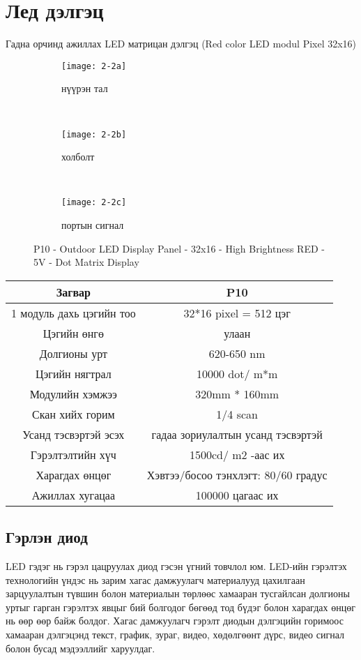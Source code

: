 \section{Лед дэлгэц}
Гадна орчинд ажиллах LED матрицан дэлгэц (Red color LED modul  Pixel 32x16)
\begin{figure}[!ht]
	\centering
	\begin{subfigure}[b]{0.3\textwidth}
		\texttt{[image: 2-2a]}
		\caption{нүүрэн тал}
	\end{subfigure}
	~
	\begin{subfigure}[b]{0.3\textwidth}
		\texttt{[image: 2-2b]}
		\caption{холболт}
	\end{subfigure}
	~
	\begin{subfigure}[b]{0.3\textwidth}
		\texttt{[image: 2-2c]}
		\caption{портын сигнал}
	\end{subfigure}
	\caption[P10 - Outdoor LED Display Panel]{P10 - Outdoor LED Display Panel - 32x16 - High Brightness RED - 5V - Dot Matrix Display}
\end{figure}

\begin{tabular}{|c|c|}
	\hline
	 Загвар &	 P10 \\ \hline
	1 модуль дахь цэгийн тоо &	32*16 pixel    =     512 цэг  \\ \hline
	Цэгийн өнгө  &	 улаан   \\ \hline           
	Долгионы урт  &	620-650  nm \\ \hline
	Цэгийн нягтрал &	 10000 dot/ m*m \\ \hline
	Модулийн хэмжээ&	 320mm * 160mm \\ \hline
	Скан хийх горим	& 1/4  scan \\ \hline
	Усанд тэсвэртэй эсэх &	гадаа зориулалтын усанд тэсвэртэй \\ \hline
	 Гэрэлтэлтийн хүч	&  1500cd/ m2 -аас их \\ \hline
	Харагдах өнцөг	& Хэвтээ/босоо тэнхлэгт: 80/60 градус \\ \hline
	Ажиллах хугацаа & 100000 цагаас их \\ \hline
\end{tabular}

\subsection{Гэрлэн диод}
LED гэдэг нь гэрэл цацруулах диод гэсэн үгний товчлол юм. LED-ийн гэрэлтэх технологийн үндэс нь зарим хагас дамжуулагч материалууд цахилгаан зарцуулалтын түвшин болон материалын төрлөөс хамааран тусгайлсан долгионы уртыг гарган гэрэлтэх явцыг бий болгодог бөгөөд тод бүдэг болон харагдах өнцөг нь өөр өөр байж болдог. Хагас дамжуулагч гэрэлт диодын дэлгэцийн горимоос хамааран дэлгэцэнд текст, график, зураг, видео, хөдөлгөөнт дүрс, видео сигнал болон бусад мэдээллийг харуулдаг.
